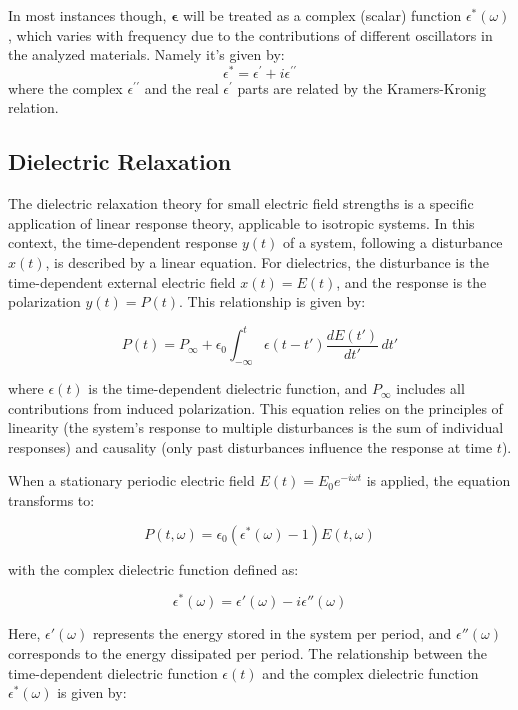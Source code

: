 In most instances though, \(\boldsymbol{ \epsilon }\) will be treated as a complex (scalar) function \( \epsilon^*(\omega) \), which varies with frequency due to the contributions of different oscillators in the analyzed materials. Namely it's given by: \[
	\epsilon^* = \epsilon^\prime + i \epsilon^{\prime \prime}
\]
where the complex $\epsilon^{\prime \prime}$ and the real $\epsilon^\prime$ parts are related by the Kramers-Kronig relation. %

\subsection{Dielectric Relaxation}

The dielectric relaxation theory for small electric field strengths is a specific application of linear response theory, applicable to isotropic systems. In this context, the time-dependent response \( y(t) \) of a system, following a disturbance \( x(t) \), is described by a linear equation. For dielectrics, the disturbance is the time-dependent external electric field \( x(t) = E(t) \), and the response is the polarization \( y(t) = P(t) \). This relationship is given by:

\[
P(t) = P_\infty + \epsilon_0 \int_{-\infty}^{t} \epsilon(t - t') \frac{dE(t')}{dt'} \, dt'
\]

where \( \epsilon(t) \) is the time-dependent dielectric function, and \( P_\infty \) includes all contributions from induced polarization. This equation relies on the principles of linearity (the system's response to multiple disturbances is the sum of individual responses) and causality (only past disturbances influence the response at time \( t \)).

When a stationary periodic electric field \( E(t) = E_0 e^{-i\omega t} \) is applied, the equation transforms to:

\[
P(t, \omega) = \epsilon_0 \left(\epsilon^*(\omega) - 1\right) E(t, \omega)
\]

with the complex dielectric function defined as:

\[
\epsilon^*(\omega) = \epsilon'(\omega) - i\epsilon''(\omega)
\]

Here, \( \epsilon'(\omega) \) represents the energy stored in the system per period, and \( \epsilon''(\omega) \) corresponds to the energy dissipated per period. The relationship between the time-dependent dielectric function \( \epsilon(t) \) and the complex dielectric function \( \epsilon^*(\omega) \) is given by:

